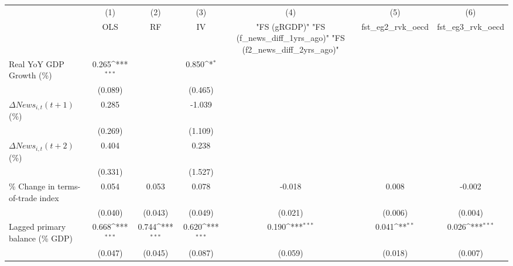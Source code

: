 {
\def\sym#1{\ifmmode^{#1}\else\(^{#1}\)\fi}
\begin{tabular}{l*{6}{c}}
\toprule
                    &\multicolumn{1}{c}{(1)}&\multicolumn{1}{c}{(2)}&\multicolumn{1}{c}{(3)}&\multicolumn{1}{c}{(4)}&\multicolumn{1}{c}{(5)}&\multicolumn{1}{c}{(6)}\\
                    &\multicolumn{1}{c}{OLS}&\multicolumn{1}{c}{RF}&\multicolumn{1}{c}{IV}&\multicolumn{1}{c}{ "FS (gRGDP)"  "FS (f_news_diff_1yrs_ago)"  "FS (f2_news_diff_2yrs_ago)" }&\multicolumn{1}{c}{fst_eg2_rvk_oecd}&\multicolumn{1}{c}{fst_eg3_rvk_oecd}\\
\midrule
Real YoY GDP Growth (\%)&       0.265\sym{***}&                     &       0.850\sym{*}  &                     &                     &                     \\
                    &     (0.089)         &                     &     (0.465)         &                     &                     &                     \\
\addlinespace
$ \Delta News_{i,t}(t+1)$ (\%)&       0.285         &                     &      -1.039         &                     &                     &                     \\
                    &     (0.269)         &                     &     (1.109)         &                     &                     &                     \\
\addlinespace
$ \Delta News_{i,t}(t+2)$ (\%)&       0.404         &                     &       0.238         &                     &                     &                     \\
                    &     (0.331)         &                     &     (1.527)         &                     &                     &                     \\
\addlinespace
\% Change in terms-of-trade index&       0.054         &       0.053         &       0.078         &      -0.018         &       0.008         &      -0.002         \\
                    &     (0.040)         &     (0.043)         &     (0.049)         &     (0.021)         &     (0.006)         &     (0.004)         \\
\addlinespace
Lagged primary balance (\% GDP)&       0.668\sym{***}&       0.744\sym{***}&       0.620\sym{***}&       0.190\sym{***}&       0.041\sym{**} &       0.026\sym{***}\\
                    &     (0.047)         &     (0.045)         &     (0.087)         &     (0.059)         &     (0.018)         &     (0.007)         \\

\end{tabular}}
